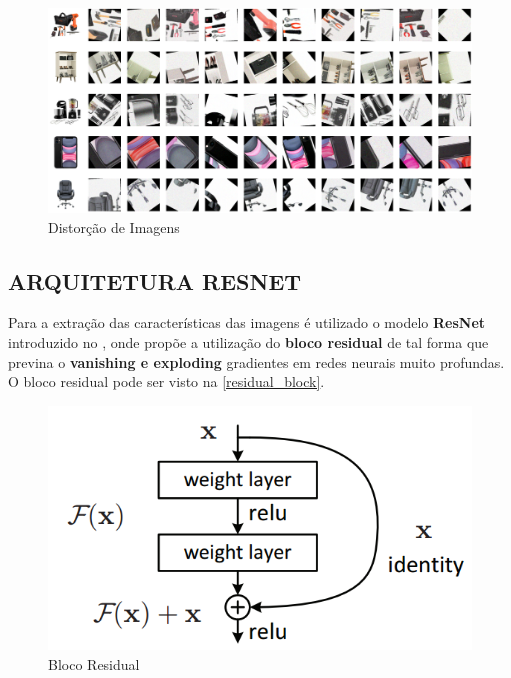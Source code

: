 \begin{figure}[htb]
	\caption{\label{imagem_distorcao} Distorção de Imagens}
	\begin{center}
	    \includegraphics[width=\textwidth]{artigo/recursos/imagens/imagem_distorcao.png}
	\end{center}
\end{figure}

\subsection{ARQUITETURA RESNET}

Para a extração das características das imagens é utilizado o modelo \textbf{ResNet} introduzido no \cite{resnet}, onde propõe a utilização do \textbf{bloco residual} de tal forma que previna o \textbf{vanishing e exploding} gradientes em redes neurais muito profundas. O bloco residual pode ser visto na \autoref{residual_block}.

\begin{figure}[htb]
	\caption{\label{residual_block} Bloco Residual}
	\begin{center}
	    \includegraphics[scale=0.4]{artigo/recursos/imagens/residual_block.png}
	\end{center}
\end{figure}

